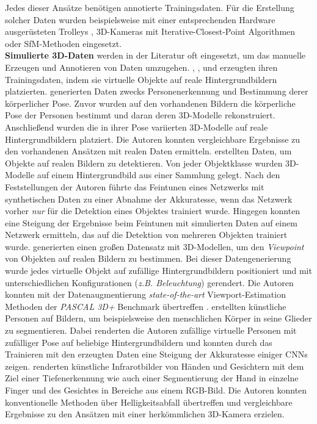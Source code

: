 Jedes dieser Ansätze benötigen annotierte Trainingsdaten. Für die Erstellung solcher Daten wurden beispielsweise mit einer entsprechenden Hardware ausgerüsteten Trolleys \cite{huitlTUMindoorExtensiveImage2012}, 3D-Kameras mit Iterative-Closest-Point Algorithmen \cite{izadiKinectFusionRealtime3D2011} oder SfM-Methoden \cite{kendallPoseNetConvolutionalNetwork2015} eingesetzt.
\\
\textbf{Simulierte 3D-Daten} werden in der Literatur oft eingesetzt, um das manuelle Erzeugen und Annotieren von Daten umzugehen. \citet{pishchulinArticulatedPeopleDetection2012a}, \citet{pengLearningDeepObject2015}, \citet{suRenderCNNViewpoint2015} und \citet{varolLearningSyntheticHumans2017} erzeugten ihren Trainingsdaten, indem sie virtuelle Objekte auf reale Hintergrundbildern platzierten. \citet{pishchulinArticulatedPeopleDetection2012a} generierten Daten zwecks Personenerkennung und Bestimmung derer körperlicher Pose. Zuvor wurden auf den vorhandenen Bildern die körperliche Pose der Personen bestimmt und daran deren 3D-Modelle rekonstruiert. Anschließend wurden die in ihrer Pose variierten 3D-Modelle auf reale Hintergrundbildern platziert. Die Autoren konnten vergleichbare Ergebnisse zu den vorhandenen Ansätzen mit realen Daten ermitteln. \citet{pengLearningDeepObject2015} erstellten Daten, um Objekte auf realen Bildern zu detektieren. Von jeder Objektklasse wurden 3D-Modelle auf einem Hintergrundbild aus einer Sammlung gelegt. Nach den Feststellungen der Autoren führte das Feintunen eines Netzwerks mit synthetischen Daten zu einer Abnahme der Akkuratesse, wenn das Netzwerk vorher \textit{nur} für die Detektion eines Objektes trainiert wurde. Hingegen konnten \citet{pengLearningDeepObject2015} eine Steigung der Ergebnisse beim Feintunen mit simulierten Daten auf einem Netzwerk ermitteln, das auf die Detektion von mehreren Objekten trainiert wurde. \citet{suRenderCNNViewpoint2015} generierten einen großen Datensatz mit 3D-Modellen, um den \textit{Viewpoint} von Objekten auf realen Bildern zu bestimmen. Bei dieser Datengenerierung wurde jedes virtuelle Objekt auf zufällige Hintergrundbildern positioniert und mit unterschiedlichen Konfigurationen (\textit{z.B. Beleuchtung}) gerendert. Die Autoren konnten mit der Datenaugmentierung \textit{state-of-the-art} Viewport-Estimation Methoden der \textit{PASCAL 3D+}\cite{xiangPASCALBenchmark3D2014} Benchmark übertreffen \cite{suRenderCNNViewpoint2015}. \citet{varolLearningSyntheticHumans2017} erstellten künstliche Personen auf Bildern, um beispielsweise den menschlichen Körper in seine Glieder zu segmentieren. Dabei renderten die Autoren zufällige virtuelle Personen mit zufälliger Pose auf beliebige Hintergrundbildern und konnten durch das Trainieren mit den erzeugten Daten eine Steigung der Akkuratesse einiger CNNs zeigen. \citet{fanelloLearningBeDepth2014} renderten künstliche Infrarotbilder von Händen und Gesichtern mit dem Ziel einer Tiefenerkennung wie auch einer Segmentierung der Hand in einzelne Finger und des Gesichtes in Bereiche aus einem RGB-Bild. Die Autoren konnten konventionelle Methoden über Helligkeitsabfall übertreffen und vergleichbare Ergebnisse zu den Ansätzen mit einer herkömmlichen 3D-Kamera erzielen. \citet{dosovitskiyFlowNetLearningOptical2015} 